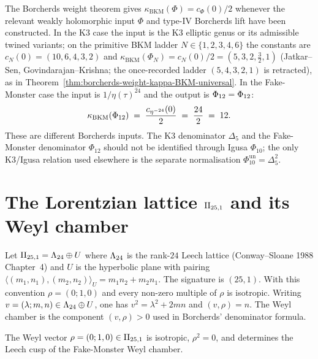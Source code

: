 \begin{remark}
\label{rem:fm-universal-borcherds-weight-scopes}
The Borcherds weight theorem gives $\kappa_{\mathrm{BKM}}(\Phi)=c_\Phi(0)/2$
whenever the relevant weakly holomorphic input \(\Phi\) and type-IV Borcherds
lift have been constructed. In the K3 case the input is the K3 elliptic
genus or its admissible twined variants; on the primitive BKM ladder
$N\in\{1,2,3,4,6\}$ the constants are
$c_N(0)=(10,6,4,3,2)$ and
$\kappa_{\mathrm{BKM}}(\Phi_N)=c_N(0)/2=(5,3,2,\tfrac32,1)$
(Jatkar--Sen, Govindarajan--Krishna; the once-recorded ladder
$(5,4,3,2,1)$ is retracted), as in
Theorem~\ref{thm:borcherds-weight-kappa-BKM-universal}. In the
Fake-Monster case the input is $1/\eta(\tau)^{24}$ and the output is
$\Phi_{12}=\Phi_{12}$:
\[
 \kappa_{\mathrm{BKM}}(\Phi_{12})
 \;=\;\frac{c_{\eta^{-24}}(0)}{2}
 \;=\;\frac{24}{2}
 \;=\;12.
\]
These are different Borcherds inputs. The K3 denominator $\Delta_5$ and
the Fake-Monster denominator $\Phi_{12}$ should not be identified through
Igusa $\Phi_{10}$; the only K3/Igusa relation used elsewhere is the
separate normalisation $\Phi_{10}^{\mathrm{un}}=\Delta_5^2$.
\end{remark}

\section{The Lorentzian lattice \texorpdfstring{$\mathrm{II}_{25,1}$}{IIlor} and its Weyl chamber}
\label{sec:fm-lattice}

Let $\mathrm{II}_{25,1} = \Lambda_{24} \oplus U$ where $\Lambda_{24}$ is the rank-$24$ Leech lattice (Conway--Sloane 1988 Chapter~4) and $U$ is the hyperbolic plane with pairing $\langle(m_1,n_1),(m_2,n_2)\rangle_U=m_1n_2+m_2n_1$. The signature is $(25,1)$. With this convention $\rho=(0;1,0)$ and every non-zero multiple of $\rho$ is isotropic. Writing $v=(\lambda;m,n)\in\Lambda_{24}\oplus U$, one has $v^2=\lambda^2+2mn$ and $(v,\rho)=n$. The Weyl chamber is the component $(v,\rho)>0$ used in Borcherds' denominator formula.

\begin{proposition}
\label{prop:fm-weyl-rho-isotropic}
The Weyl vector $\rho = (0;1,0)\in\mathrm{II}_{25,1}$ is isotropic, $\rho^2=0$, and determines the Leech cusp of the Fake-Monster Weyl chamber.
\end{proposition}

